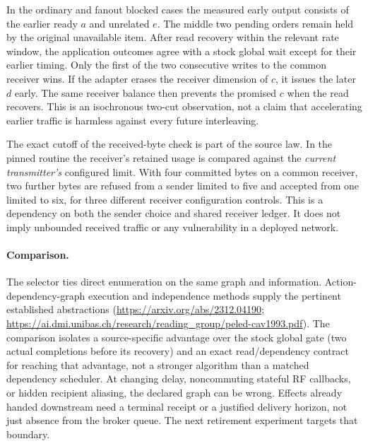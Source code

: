 \documentclass{article}
\begin{document}
In the ordinary and fanout blocked cases the measured early output consists
of the earlier ready $a$ and unrelated $e$. The middle two pending orders
remain held by the original unavailable item. After read recovery within
the relevant rate window, the application outcomes agree with a stock
global wait except for their earlier timing. Only the first of the two
consecutive writes to the common receiver wins. If the adapter erases the
receiver dimension of $c$, it issues the later $d$ early. The same receiver
balance then prevents the promised $c$ when the read recovers. This is an
isochronous two-cut observation, not a claim that accelerating earlier
traffic is harmless against every future interleaving.

The exact cutoff of the received-byte check is part of the source law.
In the pinned routine the receiver's retained usage is compared against
the \emph{current transmitter's} configured limit. With four committed
bytes on a common receiver, two further bytes are refused from a sender
limited to five and accepted from one limited to six, for three different
receiver configuration controls. This is a dependency on both the sender
choice and shared receiver ledger. It does not imply unbounded received
traffic or any vulnerability in a deployed network.

\paragraph{Comparison.}
The selector ties direct enumeration on the same graph and information.
Action-dependency-graph execution and independence methods supply the
pertinent established abstractions
(\url{https://arxiv.org/abs/2312.04190};
\url{https://ai.dmi.unibas.ch/research/reading_group/peled-cav1993.pdf}).
The comparison isolates a source-specific advantage over the stock
global gate (two actual completions before its recovery) and an exact
read/dependency contract for reaching that advantage, not a stronger
algorithm than a matched dependency scheduler. At changing delay,
noncommuting stateful RF callbacks, or hidden recipient aliasing, the
declared graph can be wrong. Effects already handed downstream need a
terminal receipt or a justified delivery horizon, not just absence from
the broker queue. The next retirement experiment targets that boundary.
\end{document}
